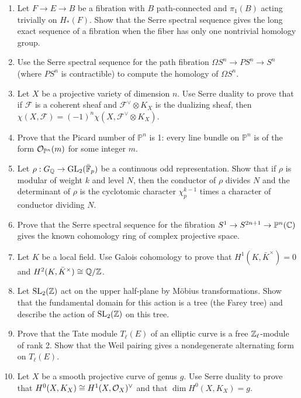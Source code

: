 \begin{enumerate}
    \item [I] Let \(F \to E \to B\) be a fibration with \(B\) path-connected and \(\pi_1(B)\) acting trivially on \(H_*(F)\). Show that the Serre spectral sequence gives the long exact sequence of a fibration when the fiber has only one nontrivial homology group.
    \item [I] Use the Serre spectral sequence for the path fibration \(\Omega S^n \to PS^n \to S^n\) (where \(PS^n\) is contractible) to compute the homology of \(\Omega S^n\).
    \item [I] Let \(X\) be a projective variety of dimension \(n\). Use Serre duality to prove that if \(\mathcal{F}\) is a coherent sheaf and \(\mathcal{F}^\vee \otimes K_X\) is the dualizing sheaf, then \(\chi(X, \mathcal{F}) = (-1)^n \chi(X, \mathcal{F}^\vee \otimes K_X)\).
    \item [B] Prove that the Picard number of \(\mathbb{P}^n\) is 1: every line bundle on \(\mathbb{P}^n\) is of the form \(\mathcal{O}_{\mathbb{P}^n}(m)\) for some integer \(m\).
    \item [A] Let \(\rho: G_{\mathbb{Q}} \to \operatorname{GL}_2(\bar{\mathbb{F}}_p)\) be a continuous odd representation. Show that if \(\rho\) is modular of weight \(k\) and level \(N\), then the conductor of \(\rho\) divides \(N\) and the determinant of \(\rho\) is the cyclotomic character \(\chi_p^{k-1}\) times a character of conductor dividing \(N\).
    \item [I] Prove that the Serre spectral sequence for the fibration \(S^1 \to S^{2n+1} \to \mathbb{P}^n(\mathbb{C})\) gives the known cohomology ring of complex projective space.
    \item [I] Let \(K\) be a local field. Use Galois cohomology to prove that \(H^1(K, \bar{K}^\times) = 0\) and \(H^2(K, \bar{K}^\times) \cong \mathbb{Q}/\mathbb{Z}\).
    \item [I] Let \(\operatorname{SL}_2(\mathbb{Z})\) act on the upper half-plane by M\"obius transformations. Show that the fundamental domain for this action is a tree (the Farey tree) and describe the action of \(\operatorname{SL}_2(\mathbb{Z})\) on this tree.
    \item [I] Prove that the Tate module \(T_\ell(E)\) of an elliptic curve is a free \(\mathbb{Z}_\ell\)-module of rank 2. Show that the Weil pairing gives a nondegenerate alternating form on \(T_\ell(E)\).
    \item [B] Let \(X\) be a smooth projective curve of genus \(g\). Use Serre duality to prove that \(H^0(X, K_X) \cong H^1(X, \mathcal{O}_X)^\vee\) and that \(\dim H^0(X, K_X) = g\).

\end{enumerate}

